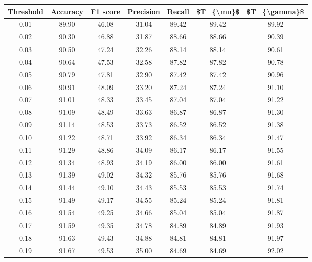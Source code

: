 \begin{tabular}{|c|c|c|c|c|c|c|}
\hline
 Threshold &  Accuracy &  F1 score &  Precision &  Recall &  \$T\_\{\textbackslash mu\}\$ &  \$T\_\{\textbackslash gamma\}\$ \\
\hline
      0.01 &     89.90 &     46.08 &      31.04 &   89.42 &      89.42 &         89.92 \\
      0.02 &     90.30 &     46.88 &      31.87 &   88.66 &      88.66 &         90.39 \\
      0.03 &     90.50 &     47.24 &      32.26 &   88.14 &      88.14 &         90.61 \\
      0.04 &     90.64 &     47.53 &      32.58 &   87.82 &      87.82 &         90.78 \\
      0.05 &     90.79 &     47.81 &      32.90 &   87.42 &      87.42 &         90.96 \\
      0.06 &     90.91 &     48.09 &      33.20 &   87.24 &      87.24 &         91.10 \\
      0.07 &     91.01 &     48.33 &      33.45 &   87.04 &      87.04 &         91.22 \\
      0.08 &     91.09 &     48.49 &      33.63 &   86.87 &      86.87 &         91.30 \\
      0.09 &     91.14 &     48.53 &      33.73 &   86.52 &      86.52 &         91.38 \\
      0.10 &     91.22 &     48.71 &      33.92 &   86.34 &      86.34 &         91.47 \\
      0.11 &     91.29 &     48.86 &      34.09 &   86.17 &      86.17 &         91.55 \\
      0.12 &     91.34 &     48.93 &      34.19 &   86.00 &      86.00 &         91.61 \\
      0.13 &     91.39 &     49.02 &      34.32 &   85.76 &      85.76 &         91.68 \\
      0.14 &     91.44 &     49.10 &      34.43 &   85.53 &      85.53 &         91.74 \\
      0.15 &     91.49 &     49.17 &      34.55 &   85.24 &      85.24 &         91.81 \\
      0.16 &     91.54 &     49.25 &      34.66 &   85.04 &      85.04 &         91.87 \\
      0.17 &     91.59 &     49.35 &      34.78 &   84.89 &      84.89 &         91.93 \\
      0.18 &     91.63 &     49.43 &      34.88 &   84.81 &      84.81 &         91.97 \\
      0.19 &     91.67 &     49.53 &      35.00 &   84.69 &      84.69 &         92.02 \\

\end{tabular}
